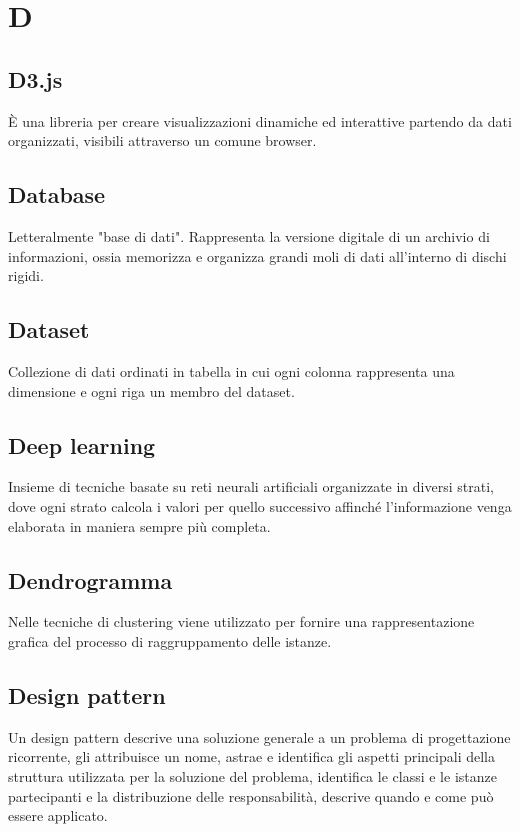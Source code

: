 \section*{D}
\markright{}

\subsection*{D3.js}
È una libreria  per creare visualizzazioni dinamiche ed interattive partendo da dati organizzati, visibili attraverso un comune browser.

\subsection*{Database}
Letteralmente "base di dati". Rappresenta la versione digitale di un archivio di informazioni, ossia memorizza e organizza grandi moli di dati all'interno di dischi rigidi.

\subsection*{Dataset}
Collezione di dati ordinati in tabella in cui ogni colonna rappresenta una dimensione e ogni riga un membro del dataset.

\subsection*{Deep learning}
Insieme di tecniche basate su reti neurali artificiali organizzate in diversi strati, dove ogni strato calcola i valori per quello successivo affinché l'informazione venga elaborata in maniera sempre più completa.

\subsection*{Dendrogramma}
Nelle tecniche di clustering viene utilizzato per fornire una rappresentazione grafica del processo di raggruppamento delle istanze.

\subsection*{Design pattern}
Un design pattern descrive una soluzione generale a un problema di progettazione ricorrente, gli attribuisce un nome, astrae e identifica gli aspetti principali della struttura utilizzata per la soluzione del problema, identifica le classi e le istanze partecipanti e la distribuzione delle responsabilità, descrive quando e come può essere applicato. 

